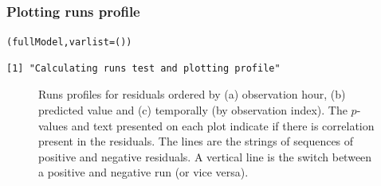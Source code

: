 \begin{frame}[fragile]
\frametitle{Plotting runs profile}
\begin{knitrout}\footnotesize
{}\color{fgcolor}\begin{kframe}
\begin{alltt}
(fullModel,  varlist = ())
\end{alltt}
\begin{verbatim}
[1] "Calculating runs test and plotting profile"
\end{verbatim}
\end{kframe}
\end{knitrout}

\begin{figure}[h!]
  \centering
  \hfill
  \hfill
  \hfill
\caption{Runs profiles for residuals ordered by (a) observation hour, (b) predicted value and (c) temporally (by observation index). The $p$-values and text presented on each plot indicate if there is correlation present in the residuals.  The lines are the strings of sequences of positive and negative residuals.  A vertical line is the switch between a positive and negative run (or vice versa).}
\label{fig:nsruns1}
\end{figure}
\end{frame}

